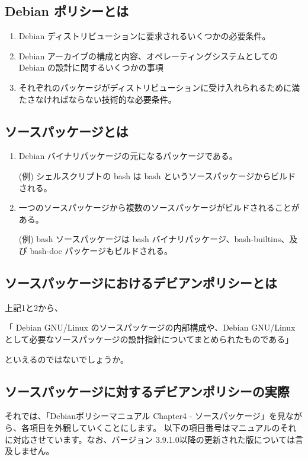 \documentclass[mingoth,a4paper]{jsarticle}
\begin{document}

\subsection {Debian ポリシーとは}
\begin{enumerate}
\item Debian ディストリビューションに要求されるいくつかの必要条件。
\item Debian アーカイブの構成と内容、オペレーティングシステムとしての Debian の設計に関するいくつかの事項
\item それぞれのパッケージがディストリビューションに受け入れられるために満たさなければならない技術的な必要条件。
\end{enumerate}

\subsection{ソースパッケージとは}
\begin{enumerate}
\item Debian バイナリパッケージの元になるパッケージである。

  (例)  シェルスクリプトの bash は bash というソースパッケージからビルドされる。
\item 一つのソースパッケージから複数のソースパッケージがビルドされることがある。

  (例)  bash ソースパッケージは bash バイナリパッケージ、bash-builtins、及び bash-doc パッケージもビルドされる。
\end{enumerate}

\subsection{ソースパッケージにおけるデビアンポリシーとは}
上記1と2から、

「 Debian GNU/Linux のソースパッケージの内部構成や、Debian GNU/Linux として必要なソースパッケージの設計指針についてまとめられたものである」

といえるのではないでしょうか。

\subsection{ソースパッケージに対するデビアンポリシーの実際}
それでは、「Debianポリシーマニュアル Chapter4 - ソースパッケージ」を見ながら、各項目を外観していくことにします。
以下の項目番号はマニュアルのそれに対応させています。なお、バージョン 3.9.1.0以降の更新された版については言及しません。
\end{document}
